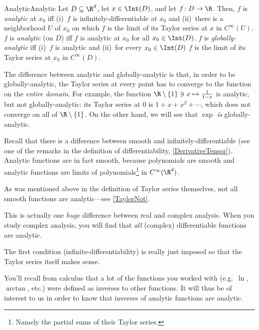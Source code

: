 \begin{dfn}{Analytic}{Analytic}
Let $D\subseteq \R ^d$, let $x\in \Int (D)$, and let $f\colon D\rightarrow \R$.  Then, $f$ is \emph{analytic} at $x_0$ iff (i)~$f$ is infinitely-differentiable at $x_0$ and (ii)~there is a neighborhood $U$ of $x_0$ on which $f$ is the limit of its Taylor series at $x$ in $C^\infty (U)$.  $f$ is \emph{analytic} (on $D$) iff $f$ is analytic at $x_0$ for all $x_0\in \Int (D)$.  $f$ is \emph{globally-analytic} iff (i)~$f$ is analytic and (ii)~for every $x_0\in \Int (D)$ $f$ is the limit of its Taylor series at $x_0$ in $C^\infty (D)$.
\begin{rmk}
The difference between analytic and globally-analytic is that, in order to be globally-analytic, the Taylor series at every point has to converge to the function on the \emph{entire domain}.  For example, the function $\R \setminus \{ 1\} \ni x\mapsto \frac{1}{1-x}$ is analytic, but not globally-analytic:  its Taylor series at $0$ is $1+x+x^2+\cdots$, which does not converge on all of $\R \setminus \{ 1\}$.  On the other hand, we will see that $\exp$ \emph{is} globally-analytic.
\end{rmk}
\begin{rmk}
Recall that there is a difference between smooth and infinitely-differentiable (see one of the remarks in the definition of differentiability, \cref{DerivativeTensor}).  Analytic functions are in fact smooth, because polynomials are smooth and analytic functions are limits of polynomials\footnote{Namely the partial sums of their Taylor series.} in $C^\infty (\R ^d)$.
\end{rmk}
\begin{rmk}
As was mentioned above in the definition of Taylor series themselves, not all smooth functions are analytic---see \cref{TaylorNot}.
\end{rmk}
\begin{rmk}
This is actually one \emph{huge} difference between real and complex analysis.  When you study complex analysis, you will find that \emph{all} (complex) differentiable functions are analytic.  
\end{rmk}
\begin{rmk}
The first condition (infinite-differentiability) is really just imposed so that the Taylor series itself makes sense.
\end{rmk}
\end{dfn}
You'll recall from calculus that a lot of the functions you worked with (e.g.~$\ln$, $\arctan$, etc.) were defined as inverses to other functions.  It will thus be of interest to us in order to know that inverses of analytic functions are analytic.
